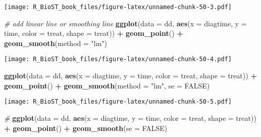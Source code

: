 \documentclass[
]{book}
\newenvironment{Shaded}{\begin{snugshade}}{\end{snugshade}}
\newcommand{\CommentTok}[1]{\textcolor[rgb]{0.56,0.35,0.01}{\textit{#1}}}
\newcommand{\DataTypeTok}[1]{\textcolor[rgb]{0.13,0.29,0.53}{#1}}
\newcommand{\KeywordTok}[1]{\textcolor[rgb]{0.13,0.29,0.53}{\textbf{#1}}}
\newcommand{\NormalTok}[1]{#1}
\newcommand{\OperatorTok}[1]{\textcolor[rgb]{0.81,0.36,0.00}{\textbf{#1}}}
\newcommand{\OtherTok}[1]{\textcolor[rgb]{0.56,0.35,0.01}{#1}}
\newcommand{\StringTok}[1]{\textcolor[rgb]{0.31,0.60,0.02}{#1}}
\begin{document}
\texttt{[image: R\_BioST\_book\_files/figure-latex/unnamed-chunk-50-3.pdf]}

\begin{Shaded}
\begin{Highlighting}[]
\CommentTok{\# add linear line or smoothing line}
\KeywordTok{ggplot}\NormalTok{(}\DataTypeTok{data =}\NormalTok{ dd, }\KeywordTok{aes}\NormalTok{(}\DataTypeTok{x =}\NormalTok{ diagtime, }\DataTypeTok{y =}\NormalTok{ time, }
                      \DataTypeTok{color =}\NormalTok{ treat, }\DataTypeTok{shape =}\NormalTok{ treat)) }\OperatorTok{+}\StringTok{ }
\StringTok{  }\KeywordTok{geom\_point}\NormalTok{() }\OperatorTok{+}\StringTok{ }
\StringTok{  }\KeywordTok{geom\_smooth}\NormalTok{(}\DataTypeTok{method =} \StringTok{"lm"}\NormalTok{)}
\end{Highlighting}
\end{Shaded}

\texttt{[image: R\_BioST\_book\_files/figure-latex/unnamed-chunk-50-4.pdf]}

\begin{Shaded}
\begin{Highlighting}[]
\KeywordTok{ggplot}\NormalTok{(}\DataTypeTok{data =}\NormalTok{ dd, }\KeywordTok{aes}\NormalTok{(}\DataTypeTok{x =}\NormalTok{ diagtime, }\DataTypeTok{y =}\NormalTok{ time, }
                      \DataTypeTok{color =}\NormalTok{ treat, }\DataTypeTok{shape =}\NormalTok{ treat)) }\OperatorTok{+}\StringTok{ }
\StringTok{  }\KeywordTok{geom\_point}\NormalTok{() }\OperatorTok{+}\StringTok{ }
\StringTok{  }\KeywordTok{geom\_smooth}\NormalTok{(}\DataTypeTok{method =} \StringTok{"lm"}\NormalTok{, }\DataTypeTok{se =} \OtherTok{FALSE}\NormalTok{)}
\end{Highlighting}
\end{Shaded}

\texttt{[image: R\_BioST\_book\_files/figure-latex/unnamed-chunk-50-5.pdf]}

\begin{Shaded}
\begin{Highlighting}[]
\CommentTok{\#}
\KeywordTok{ggplot}\NormalTok{(}\DataTypeTok{data =}\NormalTok{ dd, }\KeywordTok{aes}\NormalTok{(}\DataTypeTok{x =}\NormalTok{ diagtime, }\DataTypeTok{y =}\NormalTok{ time,}
                      \DataTypeTok{color =}\NormalTok{ treat, }\DataTypeTok{shape =}\NormalTok{ treat)) }\OperatorTok{+}\StringTok{ }
\StringTok{  }\KeywordTok{geom\_point}\NormalTok{() }\OperatorTok{+}\StringTok{ }
\StringTok{  }\KeywordTok{geom\_smooth}\NormalTok{(}\DataTypeTok{se =} \OtherTok{FALSE}\NormalTok{)}
\end{Highlighting}
\end{Shaded}
\end{document}
